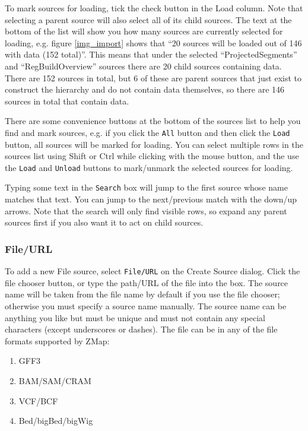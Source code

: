 \documentclass[letterpaper]{article}
\begin{document}
To mark sources for loading, tick the check button in the Load column. Note that selecting a parent source will also select all of its child sources. The text at the bottom of the list will show you how many sources are currently selected for loading, e.g. figure \ref{img_import} shows that ``20 sources will be loaded out of 146 with data (152 total)''. This means that under the selected ``ProjectedSegments'' and ``RegBuildOverview'' sources there are 20 child sources containing data. There are 152 sources in total, but 6 of these are parent sources that just exist to construct the hierarchy and do not contain data themselves, so there are 146 sources in total that contain data.

There are some convenience buttons at the bottom of the sources list to help you find and mark sources, e.g. if you click the \lstinline{All} button and then click the \lstinline{Load} button, all sources will be marked for loading. You can select multiple rows in the sources list using Shift or Ctrl while clicking with the mouse button, and the use the \lstinline{Load} and \lstinline{Unload} buttons to mark/unmark the selected sources for loading.

Typing some text in the \lstinline{Search} box will jump to the first source whose name matches that text. You can jump to the next/previous match with the down/up arrows. Note that the search will only find visible rows, so expand any parent sources first if you also want it to act on child sources.

\subsubsection{File/URL}
\label{sec_file}
To add a new File source, select \lstinline{File/URL} on the Create Source dialog. Click the file chooser button, or type the path/URL of the file into the box. The source name will be taken from the file name by default if you use the file chooser; otherwise you must specify a source name manually. The source name can be anything you like but must be unique and must not contain any special characters (except underscores or dashes). The file can be in any of the file formats supported by ZMap:

\begin{enumerate}
\item GFF3
\item BAM/SAM/CRAM
\item VCF/BCF
\item Bed/bigBed/bigWig
\end{enumerate}
\end{document}
